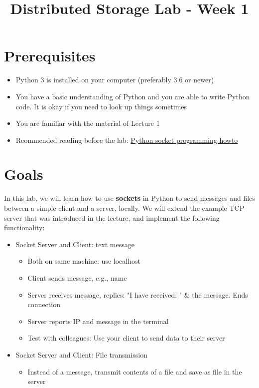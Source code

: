 

\title{Distributed Storage Lab - Week 1}





\maketitle

\section*{Prerequisites}
\begin{itemize}
\item Python 3 is installed on your computer (preferably 3.6 or newer)
\item You have a basic understanding of Python and you are able to write Python code. It is okay if you need to look up things sometimes
\item You are familiar with the material of Lecture 1
\item Reommended reading before the lab: \href{https://docs.python.org/3.7/howto/sockets.html}{Python socket programming howto}
\end{itemize}

\section{Goals}
In this lab, we will learn how to use \textbf{sockets} in Python to send messages and files between a simple client and a server, locally. We will extend the example TCP server that was introduced in the lecture, and implement the following functionality:

\begin{itemize}
\item Socket Server and Client: text message
  \begin{itemize}
  \item Both on same machine: use localhost
  \item Client sends message, e.g., name
  \item Server receives message, replies: "I have received: " \& the message. Ends connection
  \item Server reports IP and message in the terminal
  \item Test with colleagues: Use your client to send data to their server
  \end{itemize}
\item Socket Server and Client: File transmission
  \begin{itemize}
  \item Instead of a message, transmit contents of a file and save as file in the server
  \end{itemize}
\end{itemize}






